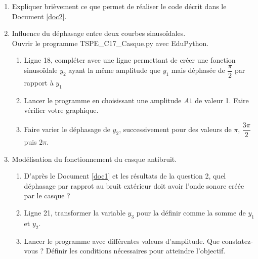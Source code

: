 \documentclass[a4paper,11pt,fleqn]{article}%
\begin{document}
\begin{enumerate}
    \item Expliquer brièvement ce que permet de réaliser le code décrit dans le Document \ref{doc2}.
    \item Influence du déphasage entre deux courbes sinusoïdales.\\
    Ouvrir le programme TSPE\_C17\_Casque.py avec EduPython.
    \begin{enumerate}
        \item Ligne 18, compléter avec une ligne permettant de créer une fonction sinusoïdale $y_2$ ayant la même amplitude que $y_1$ mais déphasée de $\dfrac{\pi}{2}$ par rapport à $y_1$
        \item Lancer le programme en choisissant une amplitude $A1$ de valeur 1. Faire vérifier votre graphique.
        \item Faire varier le déphasage de $y_2$, successivement pour des valeurs de $\pi$, $\dfrac{3\pi}{2}$ puis $2\pi$.
    \end{enumerate}
    \item Modélisation du fonctionnement du casque antibruit.
    \begin{enumerate}
        \item D'après le Document \ref{doc1} et les résultats de la question 2, quel déphasage par rapprot au bruit extérieur doit avoir l'onde sonore créée par le casque ?
        \item Ligne 21, transformer la variable $y_3$ pour la définir comme la somme de $y_1$ et $y_2$.
        \item Lancer le  programme avec différentes valeurs d'amplitude. Que constatez-vous ? Définir les conditions nécessaires pour atteindre l'objectif.
    \end{enumerate}
\end{enumerate}
\end{document}
